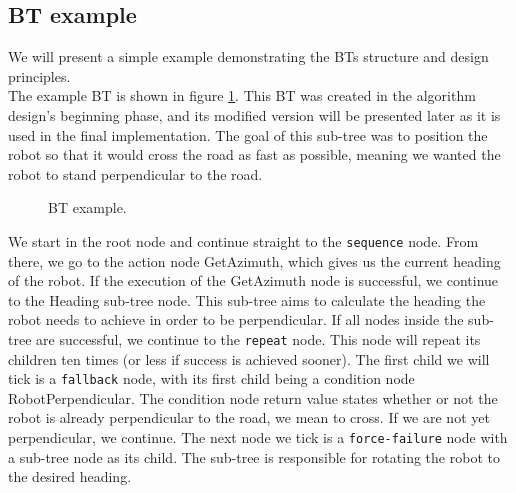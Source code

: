     \subsection{BT example}
        We will present a simple example demonstrating the BTs structure and design principles.\\
        The example BT is shown in figure \ref{fig:example_tree}. This BT was created in the algorithm design's beginning phase, and its modified version will be presented later as it is used in the final implementation. The goal of this sub-tree was to position the robot so that it would cross the road as fast as possible, meaning we wanted the robot to stand perpendicular to the road.
        \begin{figure}[H]
            \caption{BT example.}
            \label{fig:example_tree}
        \end{figure}
        We start in the root node and continue straight to the \texttt{sequence} node. From there, we go to the action node GetAzimuth, which gives us the current heading of the robot. If the execution of the GetAzimuth node is successful, we continue to the Heading sub-tree node. This sub-tree aims to calculate the heading the robot needs to achieve in order to be perpendicular. If all nodes inside the sub-tree are successful, we continue to the \texttt{repeat} node. This node will repeat its children ten times (or less if success is achieved sooner). The first child we will tick is a \texttt{fallback} node, with its first child being a condition node RobotPerpendicular. The condition node return value states whether or not the robot is already perpendicular to the road, we mean to cross. If we are not yet perpendicular, we continue. The next node we tick is a \texttt{force-failure} node with a sub-tree node as its child. The sub-tree is responsible for rotating the robot to the desired heading.


